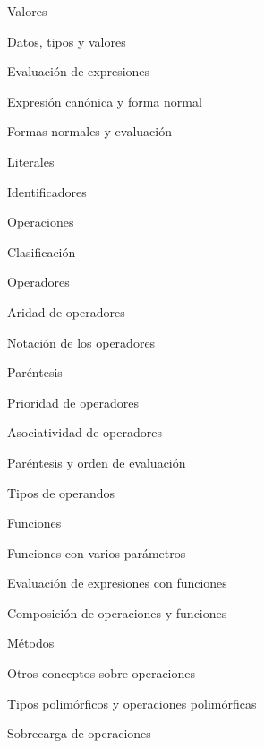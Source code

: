 \begin{longenum}
\begin{longenum}
        \item Valores
        \begin{longenum}
            \item Datos, tipos y valores
            \item Evaluación de expresiones
            \item Expresión canónica y forma normal
            \item Formas normales y evaluación
            \item Literales
            \item Identificadores
        \end{longenum}
        \item Operaciones
        \begin{longenum}
            \item Clasificación
            \item Operadores
            \begin{longenum}
                \item Aridad de operadores
                \item Notación de los operadores
                \item Paréntesis
                \item Prioridad de operadores
                \item Asociatividad de operadores
                \item Paréntesis y orden de evaluación
                \item Tipos de operandos
            \end{longenum}
            \item Funciones
            \begin{longenum}
                \item Funciones con varios parámetros
                \item Evaluación de expresiones con funciones
                \item Composición de operaciones y funciones
            \end{longenum}
            \item Métodos
        \end{longenum}
        \item Otros conceptos sobre operaciones
        \begin{longenum}
            \item Tipos polimórficos y operaciones polimórficas
            \item Sobrecarga de operaciones

\end{longenum}
\end{longenum}
\end{longenum}

